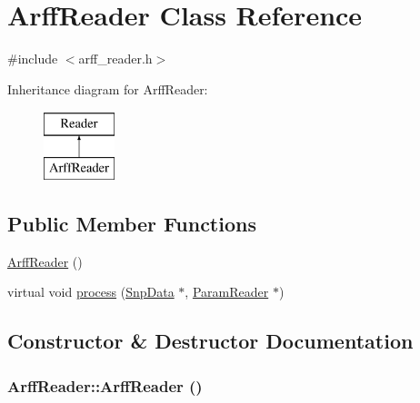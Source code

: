 \hypertarget{classArffReader}{
\section{ArffReader Class Reference}
\label{classArffReader}
}


{\ttfamily \#include $<$arff\_\-reader.h$>$}

Inheritance diagram for ArffReader:\begin{figure}[H]
\begin{center}
\leavevmode
\includegraphics[height=2cm]{classArffReader}
\end{center}
\end{figure}
\subsection*{Public Member Functions}
\begin{DoxyCompactItemize}
\item 
\hyperlink{classArffReader_a2981a55a94b575b0370a14d0991ffb05}{ArffReader} ()
\item 
virtual void \hyperlink{classArffReader_af12ed42f6e726a6e336f22381ca84082}{process} (\hyperlink{classSnpData}{SnpData} $\ast$, \hyperlink{classParamReader}{ParamReader} $\ast$)
\end{DoxyCompactItemize}


\subsection{Constructor \& Destructor Documentation}
\hypertarget{classArffReader_a2981a55a94b575b0370a14d0991ffb05}{
\subsubsection[{ArffReader}]{\setlength{\rightskip}{0pt plus 5cm}ArffReader::ArffReader ()}}
\label{classArffReader_a2981a55a94b575b0370a14d0991ffb05}


